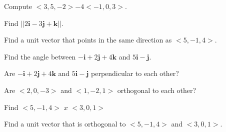 \documentclass{exam}[12pt]
\begin{document}
\pagestyle{head}

\extraheadheight{.3in}
\extrafootheight{-.3in} 


\vspace{.2in}
\large{

\begin{questions}

\question Compute $<3,5,-2> - 4<-1,0,3>$.
\vspace{.3in}

\question Find $||2\mathbf{i} -3\mathbf{j} +\mathbf{k}||$.
\vspace{.3in}

\question Find a unit vector that points in the same direction as $<5,-1,4>$.
\vspace{.3in}

\question Find the angle between $-\mathbf{i}+2\mathbf{j}+4\mathbf{k}$ and
 $5\mathbf{i}-\mathbf{j}$.
\vspace{.3in}

\question Are  $-\mathbf{i}+2\mathbf{j}+4\mathbf{k}$ and
 $5\mathbf{i}-\mathbf{j}$ perpendicular to each other?
 \vspace{.3in}
 
\question Are $<2,0,-3>$ and $<1,-2,1>$ orthogonal to each other?
\vspace{.3in}

\question Find $<5,-1,4>$ $x$ $<3,0,1>$
\vspace{.3in}

\question Find a unit vector that is orthogonal to $<5,-1,4>$ and $<3,0,1>$.
\vspace{.3in}



\end{questions}

}
\end{document}
